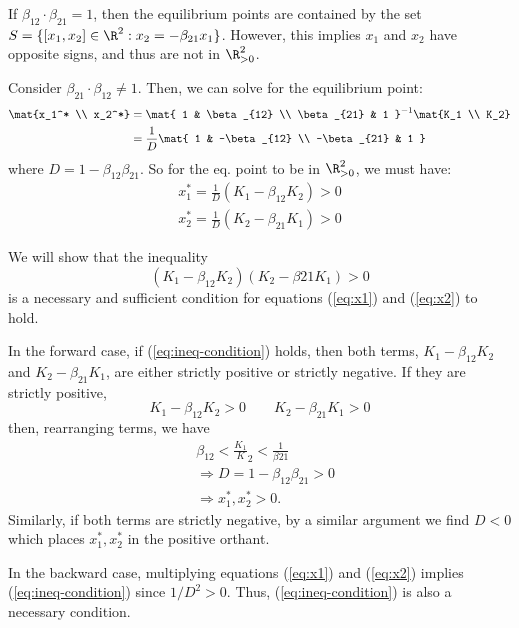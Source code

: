 \documentclass{homework}
\begin{document}
If $\beta_{12} \cdot \beta_{21} = 1$, then the equilibrium points are contained
by the set $S = \{[x_1, x_2]\in\R^2: x_2 = -\beta_{21} x_1\}$.
However, this implies $x_1$ and $x_2$ have opposite signs, and thus are not
in $\R_{>0}^2$.

Consider $\beta_{21} \cdot \beta_{12} \neq 1$. Then, we can solve for
the equilibrium point:
\begin{align*}
    \mat{x_1^* \\ x_2^*} &= \mat{
        1 & \beta_{12} \\
        \beta_{21} & 1
    }^{-1} \mat{K_1 \\ K_2} \\
    &= \frac{1}{D} \mat{
        1 & -\beta_{12} \\
        -\beta_{21} & 1
    }
\end{align*}
where $D = 1 - \beta_{12} \beta_{21}$.
So for the eq. point to be in $\R_{>0}^2$, we must have:
\begin{align}
    x_1^* = \frac{1}{D} (K_1 - \beta_{12} K_2) > 0 \label{eq:x1}\\
    x_2^* = \frac{1}{D} (K_2 - \beta_{21} K_1) > 0 \label{eq:x2}
\end{align}

We will show that the inequality
\begin{equation}
    (K_1 - \beta_{12}K_2)(K_2 - \beta{21} K_1) > 0
    \label{eq:ineq-condition}
\end{equation}
is a necessary and sufficient condition for equations (\ref{eq:x1}) and
(\ref{eq:x2}) to hold.

In the forward case, if (\ref{eq:ineq-condition}) holds, then both terms,
$K_1 - \beta_{12} K_2$ and $K_2 - \beta_{21} K_1$, are either strictly
positive or strictly negative. If they are strictly positive,
\begin{equation*}
    K_1 - \beta_{12} K_2 > 0 \qquad K_2 - \beta_{21}K_1 > 0
\end{equation*}
then, rearranging terms, we have
\begin{align*}
    &\beta_{12} < \frac{K_1} K_2 < \frac{1}{\beta{21}} \\
        &\Rightarrow D = 1 - \beta_{12}\beta_{21} > 0 \\
        &\Rightarrow x_1^*, x_2^* > 0.
\end{align*}
Similarly, if both terms are strictly negative, by a similar argument
we find $D<0$ which places $x_1^*, x_2^*$ in the positive orthant.

In the backward case, multiplying equations (\ref{eq:x1}) and (\ref{eq:x2})
implies (\ref{eq:ineq-condition}) since $1/D^2>0$. Thus, (\ref{eq:ineq-condition})
is also a necessary condition.
\end{document}
